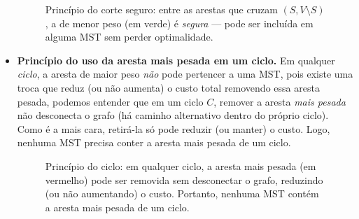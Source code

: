 \documentclass[12pt,a4paper]{article}
\begin{document}
\begin{itemize}
\begin{figure}[htbp]
    \caption{Princípio do corte seguro: entre as arestas que cruzam \((S, V\setminus S)\), a de menor peso (em verde) é \emph{segura} — pode ser incluída em alguma MST sem perder optimalidade.}
    \label{fig:mst-cut-safe}
\end{figure}
    \item \textbf{Princípio do uso da aresta mais pesada em um ciclo.} Em qualquer \emph{ciclo}, a aresta de maior peso \emph{não} pode pertencer a uma MST, pois existe uma troca que reduz (ou não aumenta) o custo total removendo essa aresta pesada, podemos entender que em um ciclo \(C\), remover a aresta \emph{mais pesada} não desconecta o grafo (há caminho alternativo dentro do próprio ciclo). Como é a mais cara, retirá-la só pode reduzir (ou manter) o custo. Logo, nenhuma MST precisa conter a aresta mais pesada de um ciclo.

\begin{figure}[htbp]
    \centering
    \caption{Princípio do ciclo: em qualquer ciclo, a aresta mais pesada (em vermelho) pode ser removida sem desconectar o grafo, reduzindo (ou não aumentando) o custo. Portanto, nenhuma MST contém a aresta mais pesada de um ciclo.}
    \label{fig:mst-cycle-heavy}
\end{figure}
\end{itemize}
\end{document}
